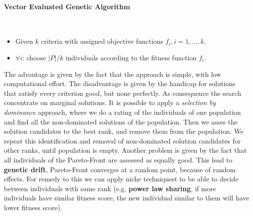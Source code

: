 \documentclass{article}
\begin{document}
\paragraph{Vector Evaluated Genetic Algorithm}\mbox{}\\
\begin{itemize}
    \item Given $k$ criteria with assigned objective functions $f_i, i=1,\dots,k$.
    \item $\forall i$: choose $|P|/k$ individuals according to the fitness function $f_i$.
\end{itemize}
The advantage is given by the fact that the approach is simple, with low computational effort.
The disadvantage is given by the handicap for solutions that satisfy every criterion good,
but none perfectly. As consequence the search concentrate on marginal solutions.
\newline\newline
It is possible to apply a \textit{selection by dominance} approach, where we do a rating of the
individuals of one population and find all the non-dominated solutions of the population. Then
we asses the solution candidates to the best rank, and remove them from the population.
We repeat this identification and removal of non-dominated solution candidates for other ranks,
until population is empty.
\newline\newline
Another problem is given by the fact that all individuals of the Pareto-Front are assessed as equally
good. This lead to \textbf{genetic drift}, Pareto-Front converges at a random point, because
of random effects. For remedy to this we can apply niche techniquest to be able to decide between
individuals with same rank (e.g. \textbf{power law sharing}, if more individuals have similar
fitness score, the new individual similar to them will have lower fitness score).
\end{document}
